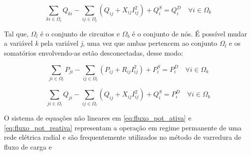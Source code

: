 \begin{equation*}
    \sum_{ki\in\Omega_{l}}Q_{ki} - \sum_{ij\in\Omega_{l}}(Q_{ij} + X_{ij}I_{ij}^{2}) + Q_{i}^{S} = Q_{i}^{D}\quad\forall i \in\Omega_{b}
\end{equation*}

Tal que, $\Omega_{l}$ é o conjunto de circuitos e $\Omega_{b}$ é o conjunto de nós.
É possível mudar a variável \textit{k} pela variável \textit{j}, uma vez que ambas pertencem ao conjunto $\Omega_{l}$ e os somatórios envolvendo-as estão desconectadas, desse modo:

\begin{equation}
    \sum_{ji\in\Omega_{l}}P_{ji} - \sum_{ij\in\Omega_{l}}(P_{ij} + R_{ij}I_{ij}^{2}) + P_{i}^{S} = P_{i}^{D}\quad\forall i \in\Omega_{b}\label{eq:fluxo_pot_ativa}  
\end{equation}


\begin{equation}
    \sum_{ji\in\Omega_{l}}Q_{ji} - \sum_{ij\in\Omega_{l}}(Q_{ij} + X_{ij}I_{ij}^{2}) + Q_{i}^{S} = P_{i}^{D}\quad\forall i \in\Omega_{b}\label{eq:fluxo_pot_reativa}
\end{equation}

O sistema de equações não lineares em \ref{eq:fluxo_pot_ativa} e \ref{eq:fluxo_pot_reativa} representam a operação em regime permanente de uma rede elétrica radial e são frequentemente utilizados no método de varredura de fluxo de carga \cite{ShirmohammadiANetworks} e \cite{DeliveryNewNetworks}
